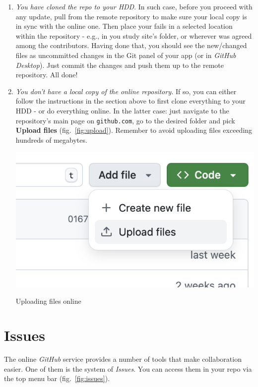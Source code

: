 \documentclass{tufte-handout}
\begin{document}
\begin{enumerate}
    \item \textit{You have cloned the repo to your HDD}. In such case, before you proceed with any update, pull from the remote repository to make sure your local copy is in sync with the online one. Then place your fails in a selected location within the repository - e.g., in you study site's folder, or wherever was agreed among the contributors. Having done that, you should see the new/changed files as uncommitted changes in the Git panel of your app (or in \textit{GitHub Desktop}). Just commit the changes and push them up to the remote repository. All done!

    \item \textit{You don't have a local copy of the online repository.} If so, you can either follow the instructions in the section above to first clone everything to your HDD - or do everything online. In the latter case: just navigate to the repository's main page on \texttt{github.com}, go to the desired folder and pick \textbf{Upload files} (fig.~\ref{fig:upload}). Remember to avoid uploading files exceeding hundreds of megabytes.

    \begin{marginfigure}
        \includegraphics[width=1\linewidth]{Zrzut ekranu 2024-12-23 o 10.05.01.png}
        \caption{Uploading files online}
        \label{fig:upload}
    \end{marginfigure}
\end{enumerate}

\section{Issues}

The online \textit{GitHub} service provides a number of tools that make collaboration easier. One of them is the system of \textit{Issues}. You can access them in your repo via the top menu bar (fig.~\ref{fig:issues}).
\end{document}
